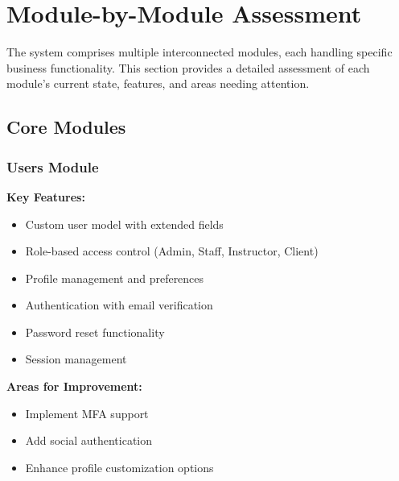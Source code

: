 \chapter{Module-by-Module Assessment}

\begin{tcolorbox}[
    enhanced,
    title={Overall Module Status: ~75\% Complete},
    attach boxed title to top left,
    boxed title style={
        colback=primary!50,
        colframe=primary!50,
        arc=0mm,
    },
    colback=white,
    colframe=primary!50,
    arc=0mm,
    fonttitle=\bfseries
]
    The system comprises multiple interconnected modules, each handling specific business functionality. This section provides a detailed assessment of each module's current state, features, and areas needing attention.
\end{tcolorbox}

\section{Core Modules}

\subsection{Users Module}
\begin{tcolorbox}[
    enhanced,
    title={Users Module: 85\% Complete},
    attach boxed title to top left,
    boxed title style={
        colback=success!50,
        colframe=success!50,
        arc=0mm,
    },
    colback=white,
    colframe=success!50,
    arc=0mm,
    fonttitle=\bfseries
]
    \textbf{Key Features:}
    \begin{itemize}
        \item Custom user model with extended fields
        \item Role-based access control (Admin, Staff, Instructor, Client)
        \item Profile management and preferences
        \item Authentication with email verification
        \item Password reset functionality
        \item Session management
    \end{itemize}
    
    \textbf{Areas for Improvement:}
    \begin{itemize}
        \item Implement MFA support
        \item Add social authentication
        \item Enhance profile customization options
    \end{itemize}
\end{tcolorbox}

